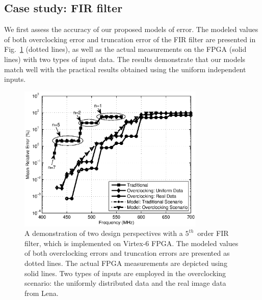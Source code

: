 \documentclass[journal]{IEEEtran}
\begin{document}
\subsection{Case study: FIR filter}
We first assess the accuracy of our proposed models of error. The modeled values of both overclocking error and truncation error of the FIR filter are presented in Fig.~\ref{FIR} (dotted lines), as well as the actual measurements on the FPGA (solid lines) with two types of input data. The results demonstrate that our models match well with the practical results obtained using the uniform independent inputs.
\begin{figure}[htbp]
  \centering
  \includegraphics[width=3.5in]{./Figures/Exp/FIR/FIR_Error_New2.eps}
  \caption{A demonstration of two design perspectives with a $5^{th}$~order FIR filter, which is implemented on Virtex-6 FPGA. The modeled values of both overclocking errors and truncation errors are presented as dotted lines. The actual FPGA measurements are depicted using solid lines. Two types of inputs are employed in the overclocking scenario: the uniformly distributed data and the real image data from Lena.}
  \label{FIR}
\end{figure}
\end{document}
